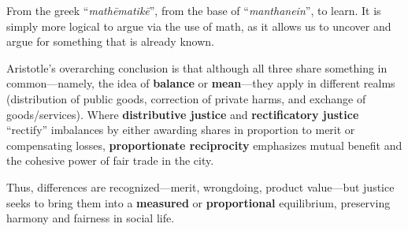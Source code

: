             \begin{remark}
                From the greek ``\textit{mathēmatikē}'', from the base of ``\textit{manthanein}'', to learn. It is simply more logical to argue via the use of math, as it allows us to uncover and argue for something that is already known.
            \end{remark}
            
            Aristotle's overarching conclusion is that although all three share something in common---namely, the idea of \textbf{balance} or \textbf{mean}---they apply in different realms (distribution of public goods, correction of private harms, and exchange of goods/services). Where \textbf{distributive justice} and \textbf{rectificatory justice} ``rectify'' imbalances by either awarding shares in proportion to merit or compensating losses, \textbf{proportionate reciprocity} emphasizes mutual benefit and the cohesive power of fair trade in the city.
            
            Thus, differences are recognized---merit, wrongdoing, product value---but justice seeks to bring them into a \textbf{measured} or \textbf{proportional} equilibrium, preserving harmony and fairness in social life.
